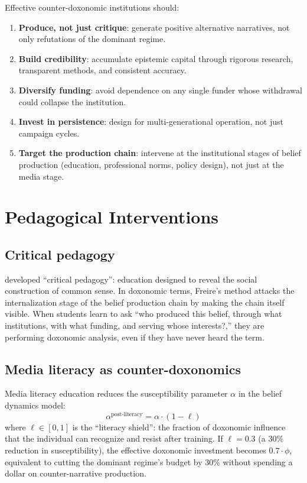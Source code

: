\begin{model}
\label{mod:counter-institution}
Effective counter-doxonomic institutions should:
\begin{enumerate}[nosep]
  \item \textbf{Produce, not just critique}: generate positive alternative narratives, not only refutations of the dominant regime.
  \item \textbf{Build credibility}: accumulate epistemic capital through rigorous research, transparent methods, and consistent accuracy.
  \item \textbf{Diversify funding}: avoid dependence on any single funder whose withdrawal could collapse the institution.
  \item \textbf{Invest in persistence}: design for multi-generational operation, not just campaign cycles.
  \item \textbf{Target the production chain}: intervene at the institutional stages of belief production (education, professional norms, policy design), not just at the media stage.
\end{enumerate}
\end{model}

\section{Pedagogical Interventions}
\label{sec:ch31-pedagogy}

\subsection{Critical pedagogy}

\textcite{freire1968} developed ``critical pedagogy'': education designed to reveal the social construction of common sense.
In doxonomic terms, Freire's method attacks the internalization stage of the belief production chain by making the chain itself visible.
When students learn to ask ``who produced this belief, through what institutions, with what funding, and serving whose interests?,'' they are performing doxonomic analysis, even if they have never heard the term.

\subsection{Media literacy as counter-doxonomics}

\begin{model}
\label{mod:media-literacy}
Media literacy education reduces the susceptibility parameter $\alpha$ in the belief dynamics model:
\[
  \alpha^{\text{post-literacy}} = \alpha \cdot (1 - \ell)
\]
where $\ell \in [0, 1]$ is the ``literacy shield'': the fraction of doxonomic influence that the individual can recognize and resist after training.
If $\ell = 0.3$ (a 30\% reduction in susceptibility), the effective doxonomic investment becomes $0.7 \cdot \phi$, equivalent to cutting the dominant regime's budget by 30\% without spending a dollar on counter-narrative production.
\end{model}

